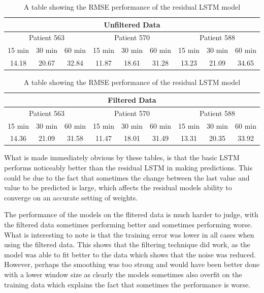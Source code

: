       \begin{table}[H]
        \centering
        \caption{A table showing the RMSE performance of the residual LSTM model}
        \begin{tabular}{|*{9}{c|}} 
          \hline
          \multicolumn{9}{|c|}{Unfiltered Data} \\ \hline
          \multicolumn{3}{|c}{Patient 563} & \multicolumn{3}{|c}{Patient 570} & \multicolumn{3}{|c|}{Patient 588} \\ \hline 
          15 min & 30 min & 60 min &15 min & 30 min & 60 min &15 min & 30 min & 60 min \\ \hline
          14.18&20.67 &32.84 &11.87 &18.61 & 31.28&13.23 &21.09 &34.65 \\ \hline
        \end{tabular}
        \begin{tabular}{|*{9}{c|}} 
          \hline
          \multicolumn{9}{|c|}{Filtered Data} \\ \hline
          \multicolumn{3}{|c}{Patient 563} & \multicolumn{3}{|c}{Patient 570} & \multicolumn{3}{|c|}{Patient 588} \\ \hline 
          15 min & 30 min & 60 min &15 min & 30 min & 60 min &15 min & 30 min & 60 min \\ \hline
          14.36 &21.09 &31.58 &11.47 &18.01 &31.49 &13.31 &20.35 &33.92 \\ \hline
        \end{tabular}
      \end{table}

      What is made immediately obvious by these tables, is that the basic LSTM performs noticeably better than the residual LSTM in making predictions. This could be due to the fact that sometimes the change between the last value and value to be predicted is large, which affects the residual models ability to converge on an accurate setting of weights.

      The performance of the models on the flitered data is much harder to judge, with the filtered data sometimes performing better and sometimes performing worse. What is interesting to note is that the training error was lower in all cases when using the filtered data. This shows that the filtering technique did work, as the model was able to fit better to the data which shows that the noise was reduced. However, perhaps the smoothing was too strong and would have been better done with a lower window size as clearly the models sometimes also overfit on the training data which explains the fact that sometimes the performance is worse. 


